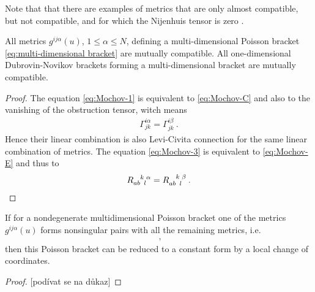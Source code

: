 Note that that there are examples of metrics that are only almost compatible, but not compatible, and for which the Nijenhuis tensor is zero \cite{Mokhov-compatibility}. 

\begin{theorem}
    All metrics $g^{ij \alpha}(u)$, $1 \leq \alpha \leq N$, defining a multi-dimensional Poisson bracket \eqref{eq:multi-dimensional bracket} are mutually compatible. All one-dimensional Dubrovin-Novikov brackets forming a multi-dimensional bracket are mutually compatible.
\end{theorem}
\begin{proof}
    The equation \eqref{eq:Mochov-1} is equivalent to \eqref{eq:Mochov-C} and also to the vanishing of the obstruction tensor, witch means
    \begin{align}
        \Gamma^{i\alpha}_{jk} = \Gamma^{i \beta}_{jk} \:.
    \end{align}
    Hence their linear combination is also Levi-Civita connection for the same linear combination of metrics.
    The equation \eqref{eq:Mochov-3} is equivalent to \eqref{eq:Mochov-E} and thus to
    \begin{align}
        R\indices{_a_b^k_l^\alpha} =  R\indices{_a_b^k_l^\beta} \:.
    \end{align}
\end{proof}

\begin{theorem}
    If for a nondegenerate multidimensional Poisson bracket one of the metrics $g^{ij \alpha}(u)$ forms nonsingular pairs with all the remaining metrics, i.e.
    \begin{align}
        \:,
    \end{align}
    then this Poisson bracket can be reduced to a constant form by a local change of coordinates.
\end{theorem}

\begin{proof}
    [podívat se na důkaz]
\end{proof}

